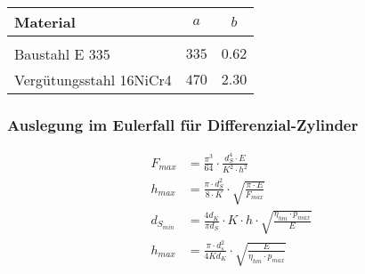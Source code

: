 \begin{tabular}{lcc}
Material & $a$ & $b$ \\
\hline \\
Baustahl E 335 & $335$ & $0.62$ \\
Vergütungsstahl 16NiCr4 & $470$ & $2.30$
\end{tabular}


\subsubsection*{Auslegung im Eulerfall für Differenzial-Zylinder}
\begin{align*}
F_{max} &= \frac{\pi^3}{64} \cdot \frac{d_S^4 \cdot E}{K^2 \cdot h^2} \\
h_{max} &= \frac{\pi \cdot d_S^2}{8 \cdot K} \cdot \sqrt{\frac{\pi \cdot E}{F_{max}} } \\
d_{S_{min}} &= \frac{4 d_K}{\pi d_S} \cdot K \cdot h \cdot \sqrt{\frac{\eta_{hm} \cdot p_{max}}{E} } \\
h_{max} &= \frac{\pi \cdot d_s^2}{4 K d_K} \cdot \sqrt{\frac{E}{\eta_{hm} \cdot p_{max}} }
\end{align*}


\newpage
